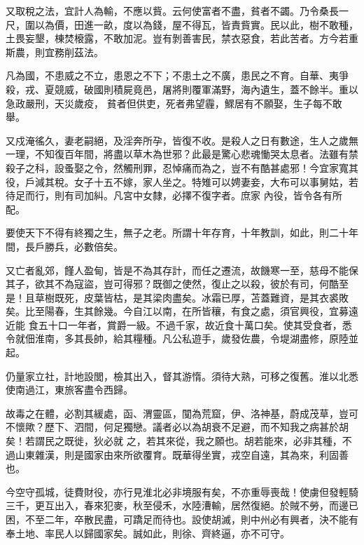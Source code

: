 \begin{pinyinscope}
 又取稅之法，宜計人為輸，不應以貲。云何使富者不盡，貧者不蠲。乃令桑長一尺，圍以為價，田進一畝，度以為錢，屋不得瓦，皆責貲實。民以此，樹不敢種，土畏妄墾，棟焚榱露，不敢加泥。豈有剝善害民，禁衣惡食，若此苦者。方今若重斯農，則宜務削茲法。



 凡為國，不患威之不立，患恩之不下；不患土之不廣，患民之不育。自華、夷爭殺，戎、夏競威，破國則積屍竟邑，屠將則覆軍滿野，海內遺生，蓋不餘半。重以急政嚴刑，天災歲疫，
 貧者但供吏，死者弗望霾，鰥居有不願娶，生子每不敢舉。



 又戍淹徭久，妻老嗣絕，及淫奔所孕，皆復不收。是殺人之日有數途，生人之歲無一理，不知復百年間，將盡以草木為世邪？此最是驚心悲魂慟哭太息者。法雖有禁殺子之科，設蚤娶之令，然觸刑罪，忍悼痛而為之，豈不有酷甚處邪！今宜家寬其役，戶減其稅。女子十五不嫁，家人坐之。特雉可以娉妻妾，大布可以事舅姑，若待足而行，則有司加糾。凡宮中女隸，必擇不復字者。庶家
 內役，皆令各有所配。



 要使天下不得有終獨之生，無子之老。所謂十年存育，十年教訓，如此，則二十年間，長戶勝兵，必數倍矣。



 又亡者亂郊，饉人盈甸，皆是不為其存計，而任之遷流，故饑寒一至，慈母不能保其子，欲其不為寇盜，豈可得邪？既御之使然，復止之以殺，彼於有司，何酷至是！且草樹既死，皮葉皆枯，是其梁肉盡矣。冰霜已厚，苫蓋難資，是其衣裘敗矣。比至陽春，生其餘幾。今自江以南，在所皆穰，有食之處，須官興役，宜募遠近能
 食五十口一年者，賞爵一級。不過千家，故近食十萬口矣。使其受食者，悉令就佃淮南，多其長帥，給其糧種。凡公私遊手，歲發佐農，令堤湖盡修，原陸並起。



 仍量家立社，計地設閭，檢其出入，督其游惰。須待大熟，可移之復舊。淮以北悉使南過江，東旅客盡令西歸。



 故毒之在體，必割其緩處，函、渭靈區，闃為荒窟，伊、洛神基，蔚成茂草，豈可不懷歟？歷下、泗間，何足獨戀。議者必以為胡衰不足避，而不知我之病甚於胡矣！若謂民之既徙，狄必就
 之，若其來從，我之願也。胡若能來，必非其種，不過山東雜漢，則是國家由來所欲覆育。既華得坐實，戎空自遠，其為來，利固善也。



 今空守孤城，徒費財役，亦行見淮北必非境服有矣，不亦重辱喪哉！使虜但發輕騎三千，更互出入，春來犯麥，秋至侵禾，水陸漕輸，居然復絕。於賊不勞，而邊已困，不至二年，卒散民盡，可蹻足而待也。設使胡滅，則中州必有興者，決不能有奉土地、率民人以歸國家矣。誠如此，則徐、齊終逼，亦不可守。




\end{pinyinscope}
